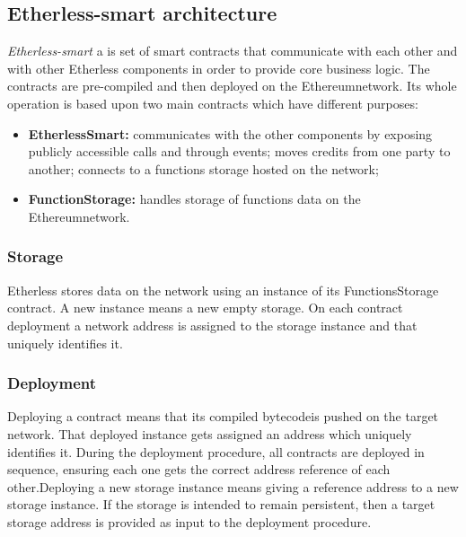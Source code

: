 \subsection{Etherless-smart architecture}
\textit{Etherless-smart} a is set of smart contracts that communicate with each other and with other Etherless components in order to provide core business logic. The contracts are pre-compiled and then deployed on the Ethereum\glo network.\newline
Its whole operation is based upon two main contracts which have different purposes:
\begin{itemize}
	\item \textbf{EtherlessSmart:} communicates with the other components by exposing publicly accessible calls and through events; moves credits from one party to another; connects to a functions storage hosted on the network;
	\item \textbf{FunctionStorage:} handles storage of functions data on the Ethereum\glo network.
\end{itemize}
\subsubsection{Storage}
Etherless stores data on the network using an instance of its FunctionsStorage contract. A new instance means a new empty storage. On each contract deployment a network address is assigned to the storage instance and that uniquely identifies it.
\subsubsection{Deployment}
Deploying a contract means that its compiled bytecode\glo is pushed on the target network. That deployed instance gets assigned an address which uniquely identifies it. During the deployment procedure, all contracts are deployed in sequence, ensuring each one gets the correct address reference of each other.\newline Deploying a new storage instance means giving a reference address to a new storage instance. If the storage is intended to remain persistent, then a target storage address is provided as input to the deployment procedure.
